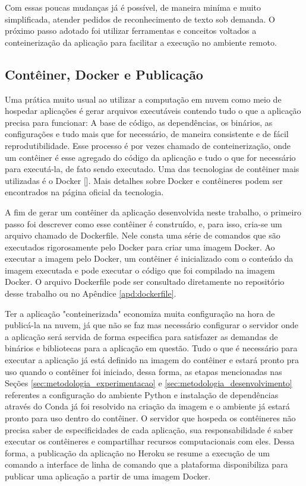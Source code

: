 Com essas poucas mudanças já é possível, de maneira miníma e muito simplificada, atender pedidos de reconhecimento de texto sob demanda. O próximo passo adotado foi utilizar ferramentas e conceitos voltados a conteinerização da aplicação para facilitar a execução no ambiente remoto.

\subsection{Contêiner, Docker e Publicação}
Uma prática muito usual ao utilizar a computação em nuvem como meio de hospedar aplicações é gerar arquivos executáveis contendo tudo o que a aplicação precisa para funcionar: A base de código, as dependências, os binários, as configurações e tudo mais que for necessário, de maneira consistente e de fácil reprodutibilidade. Esse processo é por vezes chamado de conteinerização, onde um contêiner é esse agregado do código da aplicação e tudo o que for necessário para executá-la, de fato sendo executado. Uma das tecnologias de contêiner mais utilizadas é o Docker []. Mais detalhes sobre Docker e contêineres podem ser encontrados na página oficial da tecnologia.

A fim de gerar um contêiner da aplicação desenvolvida neste trabalho, o primeiro passo foi descrever como esse contêiner é construído, e, para isso, cria-se um arquivo chamado de Dockerfile. Nele consta uma série de comandos que são executados rigorosamente pelo Docker para criar uma imagem Docker. Ao executar a imagem pelo Docker, um contêiner é inicializado com o conteúdo da imagem executada e pode executar o código que foi compilado na imagem Docker. O arquivo Dockerfile pode ser consultado diretamente no repositório desse trabalho ou no Apêndice \ref{apd:dockerfile}.

Ter a aplicação "conteinerizada" economiza muita configuração na hora de publicá-la na nuvem, já que não se faz mas necessário configurar o servidor onde a aplicação será servida de forma especifica para satisfazer as demandas de binários e bibliotecas para a aplicação em questão. Tudo o que é necessário para executar a aplicação já está definido na imagem do contêiner e estará pronto pra uso quando o contêiner foi iniciado, dessa forma, as etapas mencionadas nas Seções \ref{sec:metodologia_experimentacao} e \ref{sec:metodologia_desenvolvimento} referentes a configuração do ambiente Python e instalação de dependências através do Conda já foi resolvido na criação da imagem e o ambiente já estará pronto para uso dentro do contêiner. O servidor que hospeda os contêineres não precisa saber de especificidades de cada aplicação, sua responsabilidade é saber executar os contêineres e compartilhar recursos computacionais com eles. Dessa forma, a publicação da aplicação no Heroku se resume a execução de um comando a interface de linha de comando que a plataforma disponibiliza para publicar uma aplicação a partir de uma imagem Docker.

